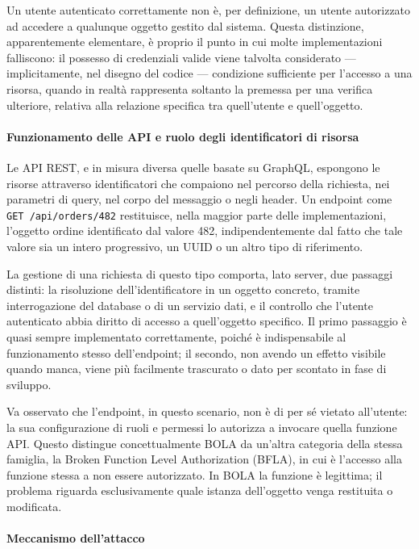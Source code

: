 Un utente autenticato correttamente non è, per definizione, un utente autorizzato ad accedere a
qualunque oggetto gestito dal sistema. Questa distinzione, apparentemente elementare, è proprio il
punto in cui molte implementazioni falliscono: il possesso di credenziali valide viene talvolta
considerato --- implicitamente, nel disegno del codice --- condizione sufficiente per l'accesso a
una risorsa, quando in realtà rappresenta soltanto la premessa per una verifica ulteriore, relativa
alla relazione specifica tra quell'utente e quell'oggetto.

\paragraph{Funzionamento delle API e ruolo degli identificatori di risorsa}

Le API REST, e in misura diversa quelle basate su GraphQL, espongono le risorse attraverso
identificatori che compaiono nel percorso della richiesta, nei parametri di query, nel corpo del
messaggio o negli header. Un endpoint come \texttt{GET /api/orders/482} restituisce, nella maggior
parte delle implementazioni, l'oggetto ordine identificato dal valore 482, indipendentemente dal
fatto che tale valore sia un intero progressivo, un UUID o un altro tipo di riferimento.

La gestione di una richiesta di questo tipo comporta, lato server, due passaggi distinti: la
risoluzione dell'identificatore in un oggetto concreto, tramite interrogazione del database o di un
servizio dati, e il controllo che l'utente autenticato abbia diritto di accesso a quell'oggetto
specifico. Il primo passaggio è quasi sempre implementato correttamente, poiché è indispensabile al
funzionamento stesso dell'endpoint; il secondo, non avendo un effetto visibile quando manca, viene
più facilmente trascurato o dato per scontato in fase di sviluppo.

Va osservato che l'endpoint, in questo scenario, non è di per sé vietato all'utente: la sua
configurazione di ruoli e permessi lo autorizza a invocare quella funzione API. Questo distingue
concettualmente BOLA da un'altra categoria della stessa famiglia, la Broken Function Level
Authorization (BFLA), in cui è l'accesso alla funzione stessa a non essere autorizzato. In BOLA la
funzione è legittima; il problema riguarda esclusivamente quale istanza dell'oggetto venga
restituita o modificata.

\paragraph{Meccanismo dell'attacco}

